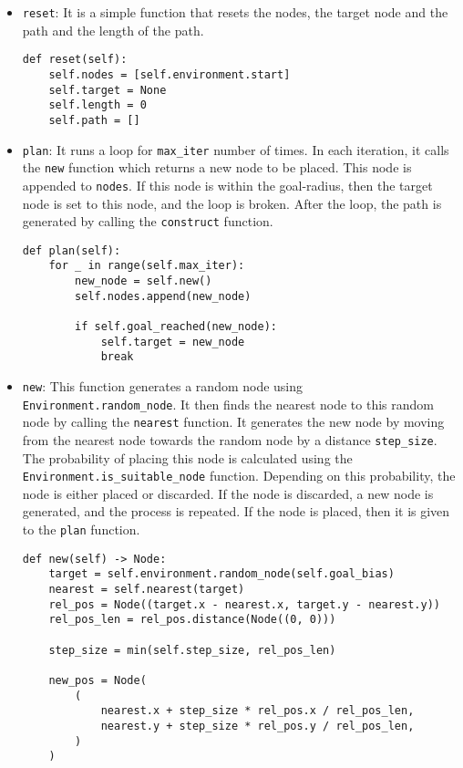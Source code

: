 \documentclass[12pt]{report}
\begin{document}
\begin{itemize}
    \item \texttt{reset}: It is a simple function that resets the nodes, the target node and the path and the length of the path.
          \begin{lstlisting}[caption={\texttt{RRT.reset}}]
def reset(self):
    self.nodes = [self.environment.start]
    self.target = None
    self.length = 0
    self.path = []
        \end{lstlisting}
    \item \texttt{plan}: It runs a loop for \texttt{max\_iter} number of times. In each iteration, it calls the \texttt{new} function which returns a new node to be placed. This node is appended to \texttt{nodes}. If this node is within the goal-radius, then the target node is set to this node, and the loop is broken. After the loop, the path is generated by calling the \texttt{construct} function.
          \begin{lstlisting}[caption={\texttt{RRT.plan}}]
def plan(self):
    for _ in range(self.max_iter):
        new_node = self.new()
        self.nodes.append(new_node)

        if self.goal_reached(new_node):
            self.target = new_node
            break
        \end{lstlisting}
    \item \texttt{new}: This function generates a random node using \texttt{Environment.random\_node}. It then finds the nearest node to this random node by calling the \texttt{nearest} function. It generates the new node by moving from the nearest node towards the random node by a distance \texttt{step\_size}. The probability of placing this node is calculated using the \texttt{Environment.is\_suitable\_node} function. Depending on this probability, the node is either placed or discarded. If the node is discarded, a new node is generated, and the process is repeated. If the node is placed, then it is given to the \texttt{plan} function.
          \begin{lstlisting}[caption={\texttt{RRT.new}}]
def new(self) -> Node:
    target = self.environment.random_node(self.goal_bias)
    nearest = self.nearest(target)
    rel_pos = Node((target.x - nearest.x, target.y - nearest.y))
    rel_pos_len = rel_pos.distance(Node((0, 0)))

    step_size = min(self.step_size, rel_pos_len)

    new_pos = Node(
        (
            nearest.x + step_size * rel_pos.x / rel_pos_len,
            nearest.y + step_size * rel_pos.y / rel_pos_len,
        )
    )


\end{lstlisting}
\end{itemize}
\end{document}
